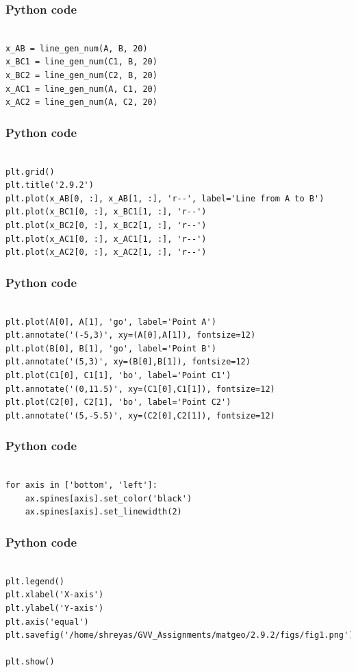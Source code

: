 \documentclass{beamer}
\begin{document}
\begin{frame}[fragile]
\frametitle{Python code}
\begin{lstlisting}

x_AB = line_gen_num(A, B, 20)
x_BC1 = line_gen_num(C1, B, 20)
x_BC2 = line_gen_num(C2, B, 20)
x_AC1 = line_gen_num(A, C1, 20)
x_AC2 = line_gen_num(A, C2, 20)

\end{lstlisting}
\end{frame}

\begin{frame}[fragile]
\frametitle{Python code}
\begin{lstlisting}

plt.grid()
plt.title('2.9.2')
plt.plot(x_AB[0, :], x_AB[1, :], 'r--', label='Line from A to B')
plt.plot(x_BC1[0, :], x_BC1[1, :], 'r--') 
plt.plot(x_BC2[0, :], x_BC2[1, :], 'r--') 
plt.plot(x_AC1[0, :], x_AC1[1, :], 'r--') 
plt.plot(x_AC2[0, :], x_AC2[1, :], 'r--') 

\end{lstlisting}
\end{frame}

\begin{frame}[fragile]
\frametitle{Python code}
\begin{lstlisting}

plt.plot(A[0], A[1], 'go', label='Point A')  
plt.annotate('(-5,3)', xy=(A[0],A[1]), fontsize=12)
plt.plot(B[0], B[1], 'go', label='Point B')  
plt.annotate('(5,3)', xy=(B[0],B[1]), fontsize=12)
plt.plot(C1[0], C1[1], 'bo', label='Point C1')  
plt.annotate('(0,11.5)', xy=(C1[0],C1[1]), fontsize=12)
plt.plot(C2[0], C2[1], 'bo', label='Point C2')  
plt.annotate('(5,-5.5)', xy=(C2[0],C2[1]), fontsize=12)

\end{lstlisting}
\end{frame}

\begin{frame}[fragile]
\frametitle{Python code}
\begin{lstlisting}

for axis in ['bottom', 'left']:
    ax.spines[axis].set_color('black')
    ax.spines[axis].set_linewidth(2)

\end{lstlisting}
\end{frame}

\begin{frame}[fragile]
\frametitle{Python code}
\begin{lstlisting}

plt.legend()
plt.xlabel('X-axis')
plt.ylabel('Y-axis')
plt.axis('equal')
plt.savefig('/home/shreyas/GVV_Assignments/matgeo/2.9.2/figs/fig1.png')

plt.show()
\end{lstlisting}
\end{frame}
\end{document}
